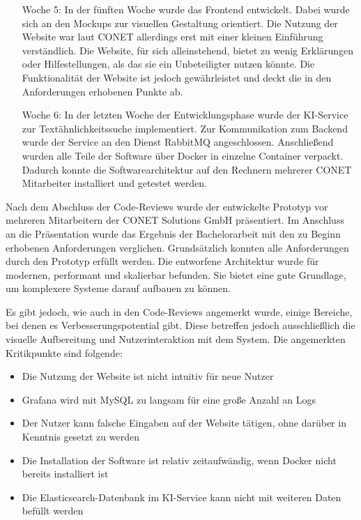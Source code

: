 \begin{itemize}[leftmargin=6em]
\item [Woche 5:] In der fünften Woche wurde das Frontend entwickelt. Dabei wurde sich an den Mockups zur visuellen Gestaltung orientiert. Die Nutzung der Website war laut CONET allerdings erst mit einer kleinen Einführung verständlich. Die Website, für sich alleinstehend, bietet zu wenig Erklärungen oder Hilfestellungen, als das sie ein Unbeteiligter nutzen könnte. Die Funktionalität der Website ist jedoch gewährleistet und deckt die in den Anforderungen erhobenen Punkte ab.
\item [Woche 6:] In der letzten Woche der Entwicklungsphase wurde der KI-Service zur Textähnlichkeitssuche implementiert. Zur Kommunikation zum Backend wurde der Service an den Dienst RabbitMQ angeschlossen. Anschließend wurden alle Teile der Software über Docker in einzelne Container verpackt. Dadurch konnte die Softwarearchitektur auf den Rechnern mehrerer CONET Mitarbeiter installiert und getestet werden.
\end{itemize}

Nach dem Abschluss der Code-Reviews wurde der entwickelte Prototyp vor mehreren Mitarbeitern der CONET Solutions GmbH präsentiert. Im Anschluss an die Präsentation wurde das Ergebnis der Bachelorarbeit mit den zu Beginn erhobenen Anforderungen verglichen. Grundsätzlich konnten alle Anforderungen durch den Prototyp erfüllt werden. Die entworfene Architektur wurde für modernen, performant und skalierbar befunden. Sie bietet eine gute Grundlage, um komplexere Systeme darauf aufbauen zu können.

Es gibt jedoch, wie auch in den Code-Reviews angemerkt wurde, einige Bereiche, bei denen es Verbesserungspotential gibt. Diese betreffen jedoch ausschließlich die visuelle Aufbereitung und Nutzerinteraktion mit dem System. Die angemerkten Kritikpunkte sind folgende:

\begin{itemize}
\item Die Nutzung der Website ist nicht intuitiv für neue Nutzer
\item Grafana wird mit MySQL zu langsam für eine große Anzahl an Logs
\item Der Nutzer kann falsche Eingaben auf der Website tätigen, ohne darüber in Kenntnis gesetzt zu werden
\item Die Installation der Software ist relativ zeitaufwändig, wenn Docker nicht bereits installiert ist
\item Die Elasticsearch-Datenbank im KI-Service kann nicht mit weiteren Daten befüllt werden
\end{itemize}
  